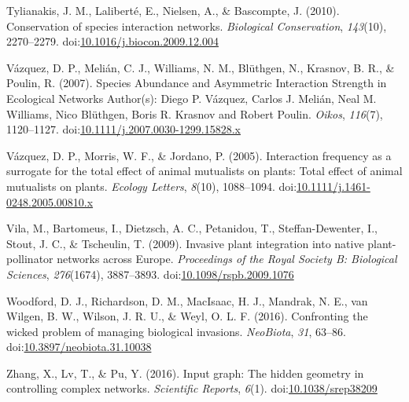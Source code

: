 \documentclass[a4paper]{artikel1}
\theoremstyle{definition}
\theoremstyle{definition}
\theoremstyle{definition}
\theoremstyle{remark}
\begin{document}
\hypertarget{ref-tylianakis_conservation_2010}{}
Tylianakis, J. M., Laliberté, E., Nielsen, A., \& Bascompte, J. (2010).
Conservation of species interaction networks. \emph{Biological
Conservation}, \emph{143}(10), 2270--2279.
doi:\href{https://doi.org/10.1016/j.biocon.2009.12.004}{10.1016/j.biocon.2009.12.004}

\hypertarget{ref-vazquez_species_2007}{}
Vázquez, D. P., Melián, C. J., Williams, N. M., Blüthgen, N., Krasnov,
B. R., \& Poulin, R. (2007). Species Abundance and Asymmetric
Interaction Strength in Ecological Networks Author(s): Diego P. Vázquez,
Carlos J. Melián, Neal M. Williams, Nico Blüthgen, Boris R. Krasnov and
Robert Poulin. \emph{Oikos}, \emph{116}(7), 1120--1127.
doi:\href{https://doi.org/10.1111/j.2007.0030-1299.15828.x}{10.1111/j.2007.0030-1299.15828.x}

\hypertarget{ref-vazquez_interaction_2005}{}
Vázquez, D. P., Morris, W. F., \& Jordano, P. (2005). Interaction
frequency as a surrogate for the total effect of animal mutualists on
plants: Total effect of animal mutualists on plants. \emph{Ecology
Letters}, \emph{8}(10), 1088--1094.
doi:\href{https://doi.org/10.1111/j.1461-0248.2005.00810.x}{10.1111/j.1461-0248.2005.00810.x}

\hypertarget{ref-vila_invasive_2009}{}
Vila, M., Bartomeus, I., Dietzsch, A. C., Petanidou, T.,
Steffan-Dewenter, I., Stout, J. C., \& Tscheulin, T. (2009). Invasive
plant integration into native plant-pollinator networks across Europe.
\emph{Proceedings of the Royal Society B: Biological Sciences},
\emph{276}(1674), 3887--3893.
doi:\href{https://doi.org/10.1098/rspb.2009.1076}{10.1098/rspb.2009.1076}

\hypertarget{ref-woodford_confronting_2016}{}
Woodford, D. J., Richardson, D. M., MacIsaac, H. J., Mandrak, N. E., van
Wilgen, B. W., Wilson, J. R. U., \& Weyl, O. L. F. (2016). Confronting
the wicked problem of managing biological invasions. \emph{NeoBiota},
\emph{31}, 63--86.
doi:\href{https://doi.org/10.3897/neobiota.31.10038}{10.3897/neobiota.31.10038}

\hypertarget{ref-zhang_input_2016}{}
Zhang, X., Lv, T., \& Pu, Y. (2016). Input graph: The hidden geometry in
controlling complex networks. \emph{Scientific Reports}, \emph{6}(1).
doi:\href{https://doi.org/10.1038/srep38209}{10.1038/srep38209}
\end{document}
